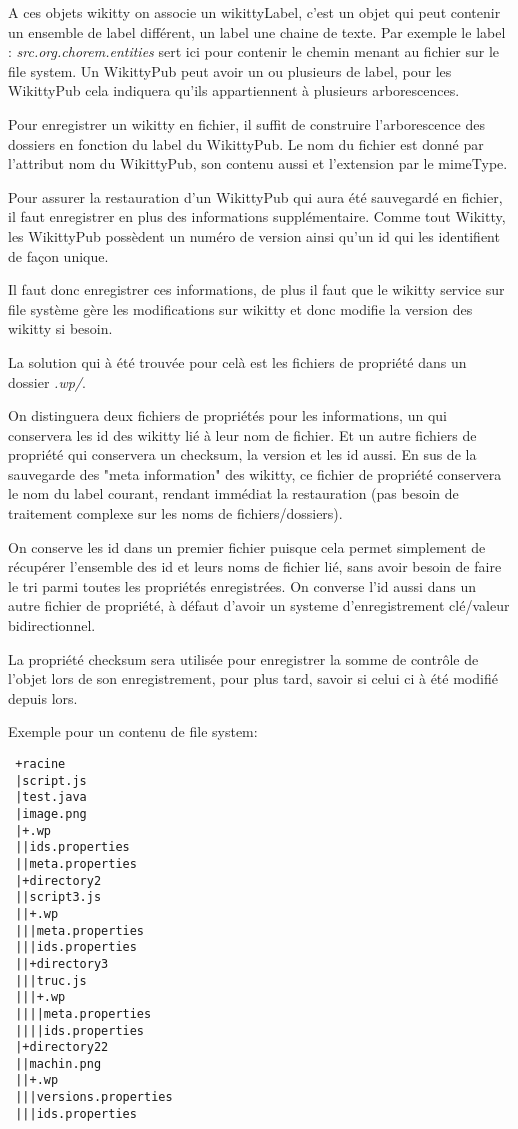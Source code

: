 A ces objets wikitty on associe un wikittyLabel, c'est un objet qui peut
contenir un ensemble de label différent, un label une chaine de texte.
Par exemple le label : \emph{src.org.chorem.entities} sert ici pour contenir le
chemin menant au fichier sur le file system. Un WikittyPub peut avoir un ou
plusieurs de label, pour les WikittyPub cela indiquera qu'ils appartiennent à
plusieurs arborescences.

Pour enregistrer un wikitty en fichier, il suffit de construire l'arborescence
des dossiers en fonction du label du WikittyPub. Le nom du fichier est donné
par l'attribut nom du WikittyPub, son contenu aussi et l'extension par le mimeType.

Pour assurer la restauration d'un WikittyPub qui aura été sauvegardé en fichier,
il faut enregistrer en plus des informations supplémentaire. Comme tout Wikitty,
les WikittyPub possèdent un numéro de version ainsi qu'un id qui les identifient
de façon unique.

Il faut donc enregistrer ces informations, de plus il faut que le wikitty
service sur file système gère les modifications sur wikitty et donc modifie la
version des wikitty si besoin.

La solution qui à été trouvée pour celà est les fichiers de propriété dans un
dossier \emph{.wp/}. 

On distinguera deux fichiers de propriétés pour les informations, un qui 
conservera les id des wikitty lié à leur nom de fichier. Et un autre fichiers de
propriété qui conservera un checksum, la version et les id aussi. En sus de
la sauvegarde des "meta information" des wikitty, ce fichier de propriété
conservera le nom du label courant, rendant immédiat la restauration (pas
besoin de traitement complexe sur les noms de fichiers/dossiers).

On conserve les id dans un premier fichier puisque cela permet simplement de 
récupérer l'ensemble des id et leurs noms de fichier lié, sans avoir besoin de 
faire le tri parmi toutes les propriétés enregistrées. On converse l'id aussi 
dans un autre fichier de propriété, à défaut d'avoir un systeme d'enregistrement
clé/valeur bidirectionnel. 

La propriété checksum sera utilisée pour enregistrer la somme de contrôle de 
l'objet lors de son enregistrement, pour plus tard, savoir si celui ci à été
modifié depuis lors.

Exemple pour un contenu de file system:
\begin{verbatim}
 +racine
 |script.js
 |test.java
 |image.png
 |+.wp
 ||ids.properties 
 ||meta.properties 
 |+directory2
 ||script3.js
 ||+.wp
 |||meta.properties
 |||ids.properties 
 ||+directory3
 |||truc.js
 |||+.wp
 ||||meta.properties
 ||||ids.properties 
 |+directory22
 ||machin.png
 ||+.wp
 |||versions.properties
 |||ids.properties 
\end{verbatim}


